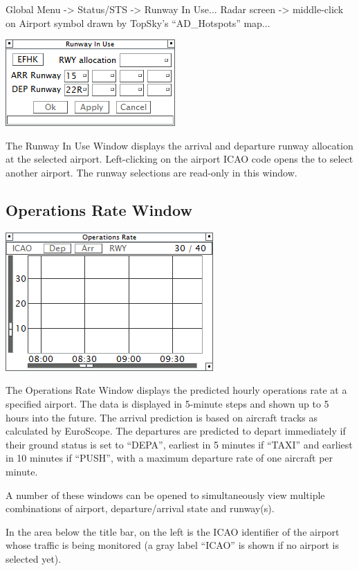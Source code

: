 \documentclass[11pt,a4paper]{memoir}
\begin{document}
Global Menu -> Status/STS -> Runway In Use...
Radar screen -> middle-click on Airport symbol drawn by TopSky’s “AD\_Hotspots” map...

\includegraphics{img/rwy.png}

The Runway In Use Window displays the arrival and departure runway allocation at the selected airport. Left-clicking on the airport ICAO code opens the \textit{} to select another airport. The runway selections are read-only in this window.

\subsection{Operations Rate Window}
\label{win:orw}

\includegraphics{img/opsrate.png}

The Operations Rate Window displays the predicted hourly operations rate at a specified airport. The data is displayed in 5-minute steps and shown up to 5 hours into the future. The arrival prediction is based on aircraft tracks as calculated by EuroScope. The departures are predicted to depart immediately if their ground status is set to “DEPA”, earliest in 5 minutes if “TAXI” and earliest in 10 minutes if “PUSH”, with a maximum departure rate of one aircraft per minute.

A number of these windows can be opened to simultaneously view multiple combinations of airport, departure/arrival state and runway(s).

In the area below the title bar, on the left is the ICAO identifier of the airport whose traffic is being monitored (a gray label “ICAO” is shown if no airport is selected yet).
\end{document}
